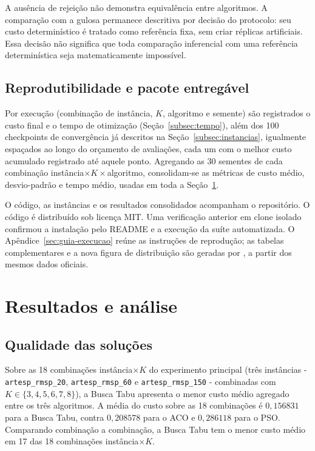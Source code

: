 \documentclass[12pt,a4paper]{article}
\begin{document}
A ausência de rejeição não demonstra equivalência entre algoritmos. A comparação com a
gulosa permanece descritiva por decisão do protocolo: seu custo determinístico é tratado
como referência fixa, sem criar réplicas artificiais. Essa decisão não significa que
toda comparação inferencial com uma referência determinística seja matematicamente
impossível.

\subsection{Reprodutibilidade e pacote entregável}
\label{subsec:reproducao}

Por execução (combinação de instância, $K$, algoritmo e semente) são
registrados o custo final e o tempo de otimização (Seção~\ref{subsec:tempo}), além dos 100
checkpoints de convergência já descritos na Seção~\ref{subsec:instancias}, igualmente espaçados
ao longo do orçamento de avaliações, cada um com o melhor custo acumulado
registrado até aquele ponto. Agregando as 30 sementes de cada combinação
instância$\times K\times$algoritmo, consolidam-se as métricas de
custo médio, desvio-padrão e tempo médio, usadas em
toda a Seção~\ref{sec:resultados}.

O código, as instâncias e os resultados consolidados acompanham o repositório.
O código é distribuído sob licença MIT. Uma verificação anterior em clone
isolado confirmou a instalação pelo README e a execução da suíte automatizada.
O Apêndice~\ref{sec:guia-execucao} reúne as instruções de reprodução; as tabelas
complementares e a nova figura de distribuição são geradas por
, a partir dos mesmos dados oficiais.

\section{Resultados e análise}
\label{sec:resultados}

\subsection{Qualidade das soluções}
\label{subsec:qualidade-solucoes}

\begin{sloppypar}
Sobre as 18 combinações instância$\times K$ do experimento principal (três
instâncias - \texttt{artesp\_rmsp\_20}, \texttt{artesp\_rmsp\_60} e
\texttt{artesp\_rmsp\_150} - combinadas com $K\in\{3,4,5,6,7,8\}$), a Busca
Tabu apresenta o menor custo médio agregado entre os três algoritmos. A média do
custo sobre as 18 combinações é $0{,}156831$ para a Busca Tabu,
contra $0{,}208578$ para o ACO e $0{,}286118$ para o PSO. Comparando
combinação a combinação, a Busca Tabu tem o menor custo médio em 17 das 18
combinações instância$\times K$.
\end{sloppypar}
\end{document}
